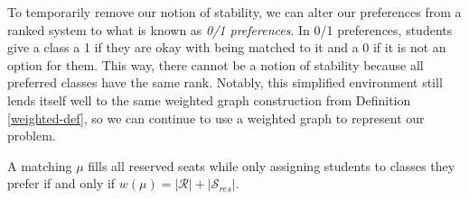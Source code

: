 To temporarily remove our notion of stability, we can alter our preferences from a
ranked system to what is known as \textit{0/1 preferences}. In 0/1 preferences,
students give a class a 1 if they are okay with being matched to it and a 0 if
it is not an option for them. This way,
there cannot be a notion of stability because all preferred classes have the
same rank. Notably, this simplified environment still lends itself well to the same
weighted graph construction from Definition \ref{weighted-def}, so we can
continue to use a weighted graph to represent our problem.

\begin{theorem}
  \label{max-weight} A matching $\mu$ fills all reserved seats while only
  assigning students to classes they prefer if and only if $w(\mu) =
  |\mathcal{R}| + |\mathcal{S}_{res}|$.
\end{theorem}


